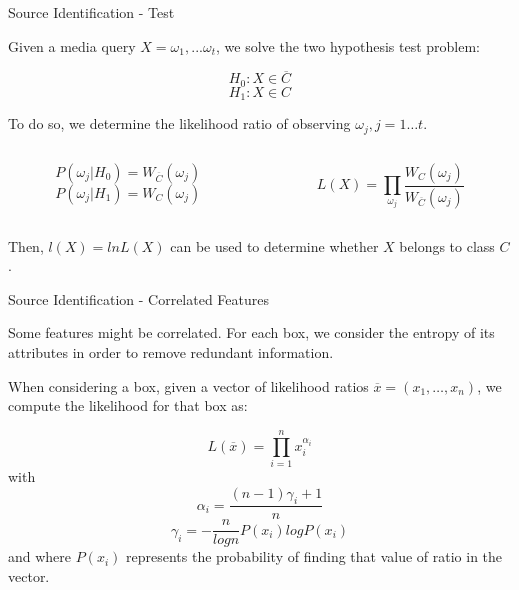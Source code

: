 \begin{tframe}{Source Identification - Test}

Given a media query $X = \omega_{1}, . . . \omega_{t}$, we solve the two hypothesis test problem:

$$  H_{0}:X \in \overline{C} $$
$$  H_{1}:X \in C $$

To do so, we determine the likelihood ratio of observing $\omega_{j}, j = 1 \ldots t$.

\vspace{1cm}

\begin{minipage}{\textwidth}
\begin{columns}[T]

\begin{column}{0.45\textwidth}
$$ P(\omega_{j}\vert H_{0}) = W_{\overline{C}}(\omega_{j}) $$
$$ P(\omega_{j}\vert H_{1}) = W_{C}(\omega_{j}) $$ 
\end{column}

\begin{column}{0.45\textwidth}
$$ L(X) = \prod\limits_{\omega_{j}}\dfrac{W_{C}(\omega_{j}) }{W_{\overline{C}}(\omega_{j})} $$
\end{column}

\end{columns}
\end{minipage}

\vspace{0.5cm}

Then, $l(X) = lnL(X)$ can be used to determine whether $X$ belongs to class $C$.

\end{tframe}

\begin{tframe}{Source Identification - Correlated Features}

Some features might be correlated. For each box, we consider the entropy of its attributes in order to remove redundant information.

\vspace{0.1cm}

When considering a box, given a vector of likelihood ratios $\overline{x} = (x_{1},\ldots,x_{n})$, we compute the likelihood for that box as:

$$ L(\overline{x}) = \prod\limits_{i=1}^{n} x_{i}^{\alpha_{i}} $$ with $$ \alpha_{i} = \dfrac{(n-1)\gamma_{i}+1}{n} $$ $$ \gamma_{i} = - \dfrac{n}{log n} P(x_{i})log P(x_{i}) $$ and where $P(x_{i})$ represents the probability of finding that value of ratio in the vector.

\end{tframe}

